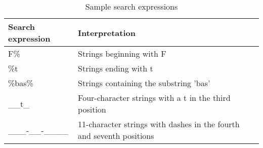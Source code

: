 \begin{table}
    \centering
    \caption{Sample search expressions}
    \begin{tabular}{ll}
        \hline
        Search expression    & Interpretation                                                       \\
        \hline
        F\%                  & Strings beginning with F                                             \\
        \%t                  & Strings ending with t                                                \\
        \%bas\%              & Strings containing the substring 'bas'                               \\
        \_\_t\_              & Four-character strings with a t in the third position                \\
        \_\_\_-\_\_-\_\_\_\_ & 11-character strings with dashes in the fourth and seventh positions \\
        \hline
    \end{tabular}
\end{table}